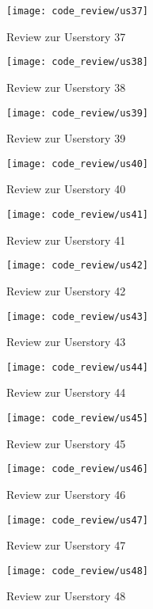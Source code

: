 \begin{figure}[H]
\centering
\texttt{[image: code\_review/us37]}
\caption{Review zur Userstory 37}
\end{figure}

\begin{figure}[H]
\centering
\texttt{[image: code\_review/us38]}
\caption{Review zur Userstory 38}
\end{figure}

\begin{figure}[H]
\centering
\texttt{[image: code\_review/us39]}
\caption{Review zur Userstory 39}
\end{figure}

\begin{figure}[H]
\centering
\texttt{[image: code\_review/us40]}
\caption{Review zur Userstory 40}
\end{figure}

\begin{figure}[H]
\centering
\texttt{[image: code\_review/us41]}
\caption{Review zur Userstory 41}
\end{figure}

\begin{figure}[H]
\centering
\texttt{[image: code\_review/us42]}
\caption{Review zur Userstory 42}
\end{figure}

\begin{figure}[H]
\centering
\texttt{[image: code\_review/us43]}
\caption{Review zur Userstory 43}
\end{figure}

\begin{figure}[H]
\centering
\texttt{[image: code\_review/us44]}
\caption{Review zur Userstory 44}
\end{figure}

\begin{figure}[H]
\centering
\texttt{[image: code\_review/us45]}
\caption{Review zur Userstory 45}
\end{figure}

\begin{figure}[H]
\centering
\texttt{[image: code\_review/us46]}
\caption{Review zur Userstory 46}
\end{figure}

\begin{figure}[H]
\centering
\texttt{[image: code\_review/us47]}
\caption{Review zur Userstory 47}
\end{figure}

\begin{figure}[H]
\centering
\texttt{[image: code\_review/us48]}
\caption{Review zur Userstory 48}
\end{figure}
